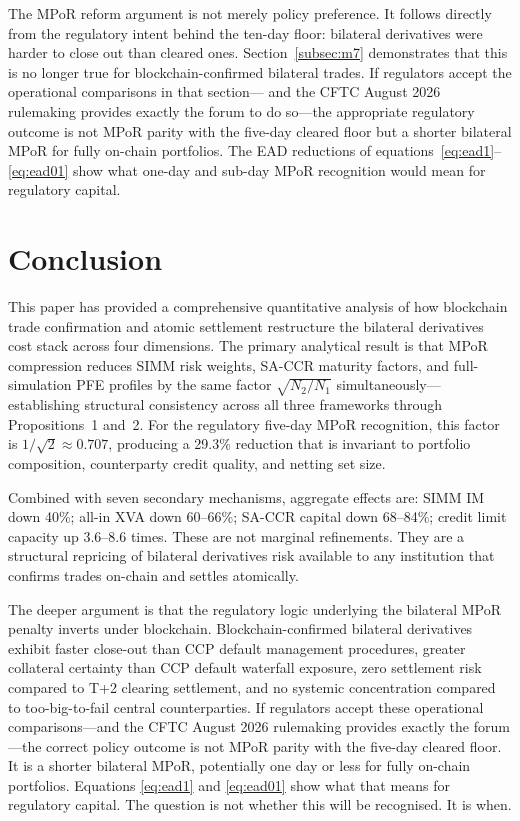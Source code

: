 \documentclass[12pt,letterpaper]{article}
\numberwithin{equation}{section}
\theoremstyle{remark}
\begin{document}
The MPoR reform argument is not merely policy preference. It follows
directly from the regulatory intent behind the ten-day floor: bilateral
derivatives were harder to close out than cleared ones. Section~\ref{subsec:m7}
demonstrates that this is no longer true for blockchain-confirmed bilateral
trades. If regulators accept the operational comparisons in that section---
and the CFTC August 2026 rulemaking provides exactly the forum to do so---the
appropriate regulatory outcome is not MPoR parity with the five-day cleared
floor but a shorter bilateral MPoR for fully on-chain portfolios. The EAD
reductions of equations~\eqref{eq:ead1}--\eqref{eq:ead01} show what one-day
and sub-day MPoR recognition would mean for regulatory capital.

\section{Conclusion}
\label{sec:conclusion}

This paper has provided a comprehensive quantitative analysis of how
blockchain trade confirmation and atomic settlement restructure the bilateral
derivatives cost stack across four dimensions. The primary analytical result
is that MPoR compression reduces SIMM risk weights, SA-CCR maturity factors,
and full-simulation PFE profiles by the same factor $\sqrt{N_2/N_1}$
simultaneously---establishing structural consistency across all three
frameworks through Propositions~1 and~2. For the regulatory five-day MPoR
recognition, this factor is $1/\!\sqrt{2} \approx 0.707$, producing a
29.3\% reduction that is invariant to portfolio composition, counterparty
credit quality, and netting set size.

Combined with seven secondary mechanisms, aggregate effects are: SIMM IM
down 40\%; all-in XVA down 60--66\%; SA-CCR capital down 68--84\%; credit
limit capacity up 3.6--8.6 times. These are not marginal refinements. They
are a structural repricing of bilateral derivatives risk available to any
institution that confirms trades on-chain and settles atomically.

The deeper argument is that the regulatory logic underlying the bilateral
MPoR penalty inverts under blockchain. Blockchain-confirmed bilateral
derivatives exhibit faster close-out than CCP default management procedures,
greater collateral certainty than CCP default waterfall exposure, zero
settlement risk compared to T+2 clearing settlement, and no systemic
concentration compared to too-big-to-fail central counterparties. If
regulators accept these operational comparisons---and the CFTC August 2026
rulemaking provides exactly the forum---the correct policy outcome is not
MPoR parity with the five-day cleared floor. It is a shorter bilateral
MPoR, potentially one day or less for fully on-chain portfolios. Equations
\eqref{eq:ead1} and \eqref{eq:ead01} show what that means for regulatory
capital. The question is not whether this will be recognised. It is when.
\end{document}
